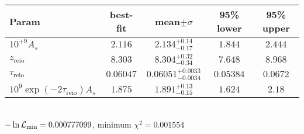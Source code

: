 \begin{tabular}{|l|c|c|c|c|} 
 \hline 
Param & best-fit & mean$\pm\sigma$ & 95\% lower & 95\% upper \\ \hline 
$10^{+9}A_{s }$ &$2.116$ & $2.134_{-0.17}^{+0.14}$ & $1.844$ & $2.444$ \\ 
$z_\mathrm{reio}$ &$8.303$ & $8.304_{-0.34}^{+0.32}$ & $7.648$ & $8.968$ \\ 
$\tau_\mathrm{reio}$ &$0.06047$ & $0.06051_{-0.0034}^{+0.0033}$ & $0.05384$ & $0.0672$ \\ 
$10^9 \exp(-2 \tau_\mathrm{reio}) A_s$ &$1.875$ & $1.891_{-0.15}^{+0.13}$ & $1.624$ & $2.18$ \\ 
\hline 
 \end{tabular} \\ 
$-\ln{\cal L}_\mathrm{min} =0.000777099$, minimum $\chi^2=0.001554$ \\ 
